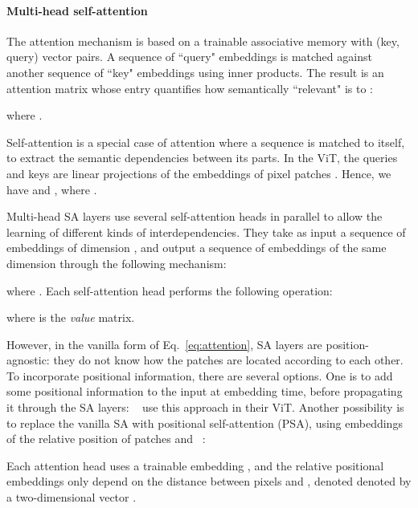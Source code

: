 \documentclass[a4paper,11pt,twocolumn]{article}
\begin{document}
\paragraph{Multi-head self-attention} \label{sec:mhsa}

The attention mechanism is based on a trainable associative memory with (key, query) vector pairs. A sequence of  ``query" embeddings  is matched against another sequence of  ``key" embeddings  using inner products. The result is an attention matrix whose entry  quantifies how semantically ``relevant"  is to :

where .

Self-attention is a special case of attention where a sequence is matched to itself, to extract the semantic dependencies between its parts. In the ViT, the queries and keys are linear projections of the embeddings of  pixel patches . Hence, we have  and , where . 

Multi-head SA layers use several self-attention heads in parallel to allow the learning of different kinds of interdependencies. They take as input a sequence of  embeddings of dimension , and output a sequence of  embeddings of the same dimension through the following mechanism:

where . Each self-attention head  performs the following operation:  

where  is the \emph{value} matrix.

However, in the vanilla form of Eq.~\ref{eq:attention}, SA layers are position-agnostic: they do not know how the patches are located according to each other. To incorporate positional information, there are several options. One is to add some positional information to the input at embedding time, before propagating it through the SA layers: ~\cite{dosovitskiy2020image} use this approach in their ViT. Another possibility is to replace the vanilla SA with positional self-attention (PSA), using embeddings  of the relative position of patches  and ~\cite{ramachandran2019stand}:

Each attention head uses a trainable embedding , and the relative positional embeddings  only depend on the distance between pixels  and ,  denoted denoted by a two-dimensional vector . 
\end{document}
